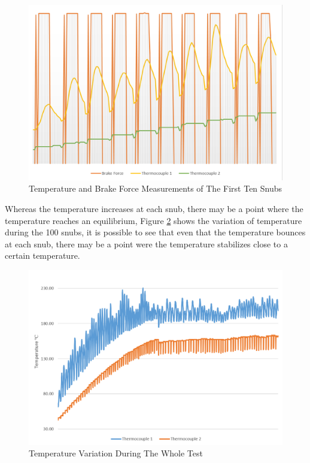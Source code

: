 		\begin{figure}[htbp]
				\centering
				\includegraphics[width=.8\textwidth]{figuras/fig-test-first-ten-snubs-force-temperature}
				\caption{Temperature and Brake Force Measurements of The First Ten Snubs}
				\label{fig:test-first-ten-snubs-force-temperature}
		\end{figure}

		\par

		Whereas the temperature increases at each snub, there may be a point where the temperature reaches an equilibrium, Figure \ref{fig:test-temperature} shows the variation of temperature during the 100 snubs, it is possible to see that even that the temperature bounces at each snub, there may be a point were the temperature stabilizes close to a certain temperature.

		\begin{figure}[htbp]
				\centering
				\includegraphics[width=.8\textwidth]{figuras/fig-test-temperature}
				\caption{Temperature Variation During The Whole Test}
				\label{fig:test-temperature}
		\end{figure}
		\par

